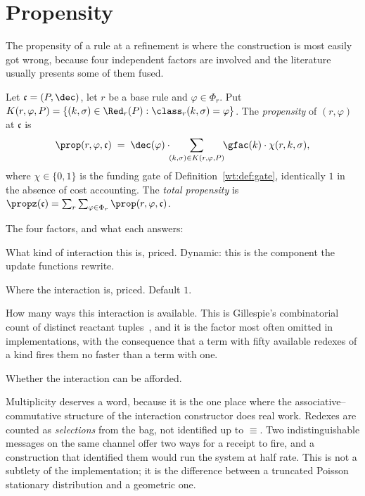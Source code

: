\section{Propensity}

The propensity of a rule at a refinement is where the construction is most easily got
wrong, because four independent factors are involved and the literature usually presents
some of them fused.

\begin{definition}[Propensity]
\label{wt:def:propensity}
Let $\mathfrak{c} = (P, \dec)$, let $r$ be a base rule and $\varphi \in \Phi_r$. Put
$K(r,\varphi,P) = \{(k,\sigma) \in \Red_r(P) : \class_r(k,\sigma) = \varphi\}$. The
\emph{propensity} of $(r,\varphi)$ at $\mathfrak{c}$ is
\[
  \prop(r,\varphi,\mathfrak{c})
  \;=\;
  \dec(\varphi) \cdot \!\!\sum_{(k,\sigma) \in K(r,\varphi,P)}\!\! \gfac(k) \cdot \chi(r,k,\sigma),
\]
where $\chi \in \{0,1\}$ is the funding gate of Definition~\ref{wt:def:gate}, identically
$1$ in the absence of cost accounting. The \emph{total propensity} is
$\propz(\mathfrak{c}) = \sum_r \sum_{\varphi \in \Phi_r} \prop(r,\varphi,\mathfrak{c})$.
\end{definition}

The four factors, and what each answers:

\begin{description}[leftmargin=1.6em,style=nextline]
  \item[$\dec(\varphi)$ --- the rate constant.] What kind of interaction this is, priced.
        Dynamic: this is the component the update functions rewrite.
  \item[$\gfac(k)$ --- the geometric factor.] Where the interaction is, priced. Default
        $1$.
  \item[The cardinality of the sum --- multiplicity.] How many ways this interaction is
        available. This is Gillespie's combinatorial count of distinct reactant
        tuples~\cite{gillespie1977exact}, and it is the factor most often omitted in
        implementations, with the consequence that a term with fifty available redexes of
        a kind fires them no faster than a term with one.
  \item[$\chi$ --- the funding gate.] Whether the interaction can be afforded.
\end{description}

Multiplicity deserves a word, because it is the one place where the associative--commutative
structure of the interaction constructor does real work. Redexes are counted as
\emph{selections} from the bag, not identified up to $\equiv$. Two indistinguishable
messages on the same channel offer two ways for a receipt to fire, and a construction that
identified them would run the system at half rate. This is not a subtlety of the
implementation; it is the difference between a truncated Poisson stationary distribution
and a geometric one.

